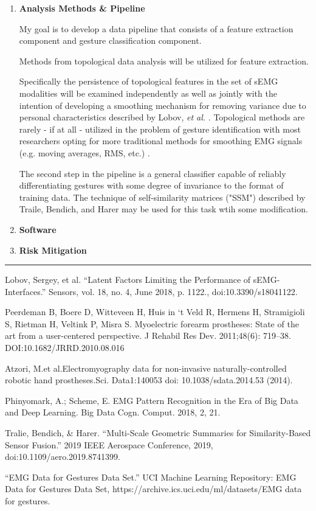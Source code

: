 \documentclass[11pt]{article}
\begin{document}
\begin{enumerate}
\item \textbf{Analysis Methods \& Pipeline}

My goal is to develop a data pipeline that consists of a feature extraction component and gesture classification component.

Methods from topological data analysis will be utilized for feature extraction.

Specifically the persistence of topological features in the set of sEMG modalities will be examined independently as well as jointly with the intention of developing a smoothing mechanism for removing variance due to personal characteristics described by Lobov, \emph{et al.} \cite{lobov}. Topological methods are rarely - if at all - utilized in the problem of gesture identification with most researchers opting for more traditional methods for smoothing EMG signals (e.g. moving averages, RMS, etc.) \cite{state}.

The second step in the pipeline is a general classifier capable of reliably differentiating gestures with some degree of invariance to the format of training data. The technique of self-similarity matrices ("SSM") described by Traile, Bendich, and Harer may be used for this task wtih some modification\cite{ssm}.

\item \textbf{Software}


\item \textbf{Risk Mitigation}

\end{enumerate}

\begin{center}
\noindent\rule{16cm}{0.4pt}
\end{center}


\begin{thebibliography}{5}

 Lobov, Sergey, et al. “Latent Factors Limiting the Performance of sEMG-Interfaces.” Sensors, vol. 18, no. 4, June 2018, p. 1122., doi:10.3390/s18041122.

 Peerdeman  B,  Boere  D,  Witteveen  H,  Huis  in  ‘t  Veld  R,  Hermens H, Stramigioli S, Rietman H, Veltink P, Misra S. Myoelectric  forearm  prostheses:  State  of  the  art  from  a  user-centered perspective. J Rehabil Res Dev. 2011;48(6): 719–38. DOI:10.1682/JRRD.2010.08.016

 Atzori, M.et al.Electromyography data for non-invasive naturally-controlled robotic hand prostheses.Sci. Data1:140053 doi: 10.1038/sdata.2014.53 (2014).

 Phinyomark, A.; Scheme, E. EMG Pattern Recognition in the Era of Big Data and Deep Learning. Big Data Cogn. Comput. 2018, 2, 21. 

 Tralie, Bendich, \& Harer. “Multi-Scale Geometric Summaries for Similarity-Based Sensor Fusion.” 2019 IEEE Aerospace Conference, 2019, doi:10.1109/aero.2019.8741399.

 “EMG Data for Gestures Data Set.” UCI Machine Learning Repository: EMG Data for Gestures Data Set, https://archive.ics.uci.edu/ml/datasets/EMG data for gestures.

\end{thebibliography}
  
\end{document}
